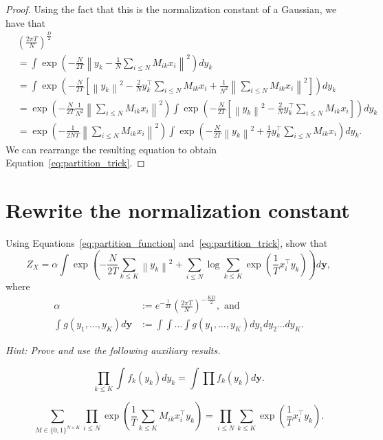 \begin{proof}
Using the fact that this is the normalization constant of a Gaussian, we have that
%
\begin{align}
&\left(\frac{2\pi T}{N}\right)^{\frac{D}{2}}\\
 &= \int \exp\left(-\frac{N}{2T} \left\|y_k - \frac{1}{N}\sum_{i \leq N}M_{ik}x_i\right\|^2\right)dy_k\\
&= \int \exp\left(-\frac{N}{2T}\left[ \left\|y_k\right\|^2 - \frac{2}{N}y_k^\top\sum_{i \leq N}M_{ik}x_i + \frac{1}{N^2}\left\|\sum_{i \leq N}M_{ik}x_i\right\|^2\right]\right)dy_k\\
&= \exp\left(-\frac{N}{2T}\frac{1}{N^2}\left\|\sum_{i \leq N}M_{ik}x_i\right\|^2\right)\int \exp\left(-\frac{N}{2T}\left[ \left\|y_k\right\|^2 - \frac{2}{N}y_k^\top\sum_{i \leq N}M_{ik}x_i\right]\right)dy_k\\
&= \exp\left(-\frac{1}{2NT}\left\|\sum_{i \leq N}M_{ik}x_i\right\|^2\right)\int \exp\left(-\frac{N}{2T}\left\|y_k\right\|^2 +\frac{1}{T}y_k^\top\sum_{i \leq N}M_{ik}x_i\right)dy_k.
\end{align}
%
We can rearrange the resulting equation to obtain Equation~\ref{eq:partition_trick}.
\end{proof}

\section{Rewrite the normalization constant}
\label{sec:swap_sum_prod}

\begin{exercise}
Using Equations~\ref{eq:partition_function} and~\ref{eq:partition_trick}, show that
%
\begin{equation}
Z_X = \alpha \int\exp\left(-\frac{N}{2T}\sum_{k \leq K} \left\|y_k\right\|^2 + \sum_{i \leq N} \log \sum_{k \leq K} \exp\left(\frac{1}{T}x_i^\top y_k\right)\right)d\mathbf{y},
\end{equation}
%
where
%
\begin{align}
\alpha &:= e^{-\frac{1}{2T}}\left(\frac{2\pi T}{N}\right)^{-\frac{KD}{2}}, \text{ and}\\
\int g(y_1, \ldots, y_K)d\mathbf{y} &:= \int \int \ldots \int g(y_1, \ldots, y_K) dy_1 dy_2\ldots dy_K.
\end{align}

\textit{Hint: Prove and use the following auxiliary results.}

$$\prod_{k \leq K} \int f_k(y_k) dy_k = \int \prod f_k(y_k) d\mathbf{y}.$$

$$\sum_{M \in \{0, 1\}^{N \times K}}\prod_{i \leq N}\exp\left(\frac{1}{T}\sum_{k \leq K}M_{ik}x_i^\top y_k\right) = \prod_{i \leq N}\sum_{k \leq K}\exp\left(\frac{1}{T}x_i^\top y_k\right).$$
\end{exercise}

